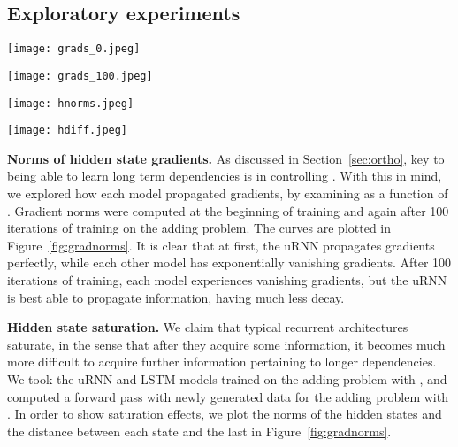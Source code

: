 \documentclass{article}
\begin{document}
\subsection{Exploratory experiments}

\begin{figure*}[t!] 
  \begin{minipage}[b]{0.25\linewidth}
    \centering
    \texttt{[image: grads\_0.jpeg]}
  \end{minipage}\begin{minipage}[b]{0.25\linewidth}
    \centering
    \texttt{[image: grads\_100.jpeg]}
  \end{minipage}
  \begin{minipage}[b]{0.25\linewidth}
    \centering
    \texttt{[image: hnorms.jpeg]}
  \end{minipage}\begin{minipage}[b]{0.25\linewidth}
    \centering
    \texttt{[image: hdiff.jpeg]}
  \end{minipage}
  \caption{From left to right. Norms of the gradients with respect to hidden states i.e.  
    at (i) beginning of training, (ii) after 100 iterations.
   (iii) Norms of the hidden states and (iv)  distance between hidden states and final hidden state.
   The gradient norms of uRNNs do not decay as fast as for other models as training progresses.
uRNN hidden state norms stay much more consistent over time than the LSTM. 
         LSTM hidden states stay almost the same after a number of time steps, 
         suggesting that it is not able to use new input information.
}
  \label{fig:gradnorms} 
\end{figure*}

{\bf Norms of hidden state gradients.} As discussed in Section~\ref{sec:ortho}, key to being able to learn long term 
dependencies is in controlling . 
With this in mind, we explored how each model propagated gradients, by examining 
 as a function of . 
Gradient norms were computed at the beginning of training and again after 100 iterations of
training on the adding problem. The curves are plotted in Figure~\ref{fig:gradnorms}.
It is clear that at first, the uRNN propagates gradients perfectly, while each other model has 
exponentially vanishing gradients. 
After 100 iterations of training, each model experiences vanishing gradients, 
but the uRNN is best able to propagate information, having much less decay.

\vspace{1mm}
{\bf Hidden state saturation.}
We claim that typical recurrent architectures saturate, in the 
sense that after they acquire some information, it becomes much more difficult to acquire further information pertaining
to longer dependencies.  
We took the uRNN and LSTM models trained on the adding problem with , and computed 
a forward pass with newly generated data for the adding problem with . In order to show saturation
effects, we plot the norms of the hidden states and the  distance between each state and the last in
Figure~\ref{fig:gradnorms}.    
\end{document}
